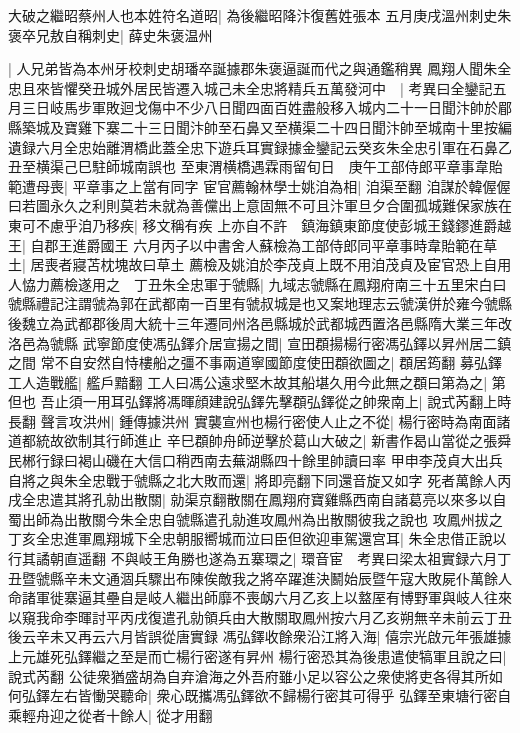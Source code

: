 大破之繼昭蔡州人也本姓符名道昭|{
	為後繼昭降汴復舊姓張本}
五月庚戌溫州刺史朱褒卒兄敖自稱刺史|{
	薛史朱褒温州}


|{
	人兄弟皆為本州牙校刺史胡璠卒誕據郡朱褒逼誕而代之與通鑑稍異}
鳳翔人聞朱全忠且來皆懼癸丑城外居民皆遷入城己未全忠將精兵五萬發河中　|{
	考異曰全鑾記五月三日岐馬步軍敗迴戈傷中不少八日聞四面百姓盡般移入城内二十一日聞汴帥於郿縣築城及寶雞下寨二十三日聞汴帥至石鼻又至横渠二十四日聞汴帥至城南十里按編遺録六月全忠始離渭橋此蓋全忠下遊兵耳實録據金鑾記云癸亥朱全忠引軍在石鼻乙丑至横渠己巳駐師城南誤也}
至東渭横橋遇霖雨留旬日　庚午工部侍郎平章事韋貽範遭母喪|{
	平章事之上當有同字}
宦官薦翰林學士姚洎為相|{
	洎渠至翻}
洎謀於韓偓偓曰若圖永久之利則莫若未就為善儻出上意固無不可且汴軍旦夕合圍孤城難保家族在東可不慮乎洎乃移疾|{
	移文稱有疾}
上亦自不許　鎮海鎮東節度使彭城王錢鏐進爵越王|{
	自郡王進爵國王}
六月丙子以中書舍人蘇檢為工部侍郎同平章事時韋貽範在草土|{
	居喪者寢苫枕塊故曰草土}
薦檢及姚洎於李茂貞上既不用洎茂貞及宦官恐上自用人恊力薦檢遂用之　丁丑朱全忠軍于虢縣|{
	九域志虢縣在鳳翔府南三十五里宋白曰虢縣禮記注謂虢為郭在武都南一百里有虢叔城是也又案地理志云虢漢併於雍今虢縣後魏立為武都郡後周大統十三年遷同州洛邑縣城於武都城西置洛邑縣隋大業三年改洛邑為虢縣}
武寧節度使馮弘鐸介居宣揚之間|{
	宣田頵揚楊行密馮弘鐸以昇州居二鎮之間}
常不自安然自恃樓船之彊不事兩道寧國節度使田頵欲圖之|{
	頵居筠翻}
募弘鐸工人造戰艦|{
	艦戶黯翻}
工人曰馮公遠求堅木故其船堪久用今此無之頵曰第為之|{
	第但也}
吾止須一用耳弘鐸將馮暉顔建說弘鐸先擊頵弘鐸從之帥衆南上|{
	說式芮翻上時長翻}
聲言攻洪州|{
	鍾傳據洪州}
實襲宣州也楊行密使人止之不從|{
	楊行密時為南面諸道都統故欲制其行師進止}
辛巳頵帥舟師逆擊於葛山大破之|{
	新書作曷山當從之張舜民郴行録曰褐山磯在大信口稍西南去蕪湖縣四十餘里帥讀曰率}
甲申李茂貞大出兵自將之與朱全忠戰于虢縣之北大敗而還|{
	將即亮翻下同還音旋又如字}
死者萬餘人丙戌全忠遣其將孔勍出散關|{
	勍渠京翻散關在鳳翔府寶雞縣西南自諸葛亮以來多以自蜀出師為出散關今朱全忠自虢縣遣孔勍進攻鳳州為出散關彼我之說也}
攻鳳州拔之丁亥全忠進軍鳳翔城下全忠朝服嚮城而泣曰臣但欲迎車駕還宫耳|{
	朱全忠借正說以行其譎朝直遥翻}
不與岐王角勝也遂為五寨環之|{
	環音宦　考異曰梁太祖實録六月丁丑暨虢縣辛未文通涸兵驟出布陳俟敵我之將卒躍進決鬭始辰暨午寇大敗屍仆萬餘人命諸軍徙寨逼其壘自是岐人繼出師靡不喪衂六月乙亥上以盩厔有博野軍與岐人往來以窺我命李暉討平丙戌復遣孔勍領兵由大散關取鳳州按六月乙亥朔無辛未前云丁丑後云辛未又再云六月皆誤從唐實録}
馮弘鐸收餘衆沿江將入海|{
	僖宗光啟元年張雄據上元雄死弘鐸繼之至是而亡楊行密遂有昇州}
楊行密恐其為後患遣使犒軍且說之曰|{
	說式芮翻}
公徒衆猶盛胡為自弃滄海之外吾府雖小足以容公之衆使將吏各得其所如何弘鐸左右皆慟哭聽命|{
	衆心既攜馮弘鐸欲不歸楊行密其可得乎}
弘鐸至東塘行密自乘輕舟迎之從者十餘人|{
	從才用翻}
